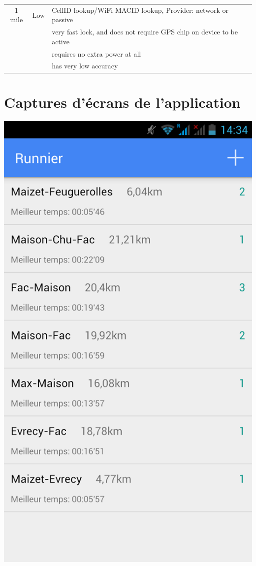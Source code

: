 \begin{appendices}
\begin{center}
\begin{tabular}{| c | c | l | }
    1 mile & Low & CellID lookup/WiFi MACID lookup, Provider: network or passive \\
     && very fast lock, and does not require GPS chip on device to be active \\
	 && requires no extra power at all \\ 
     && has very low accuracy \\
     \hline
   \end{tabular}
 \end{center}
\caption{Les providers Android\footnote{\href{http://developerlife.com/tutorials/?p=1375}{Source}}}

\chapter{Captures d'écrans de l'application}
\label{Annexe3}
\begin{multicols}{3}
\begin{img}
  \includegraphics[scale=0.3]{img/home.jpg}

\end{img}
\end{multicols}
\end{appendices}
